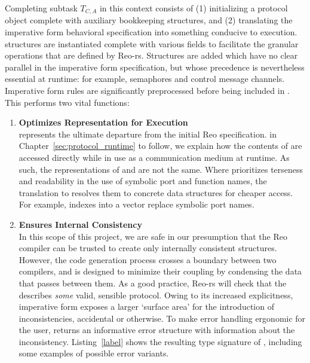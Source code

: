 Completing subtask $T_{C,A}$ in this context consists of (1) initializing a protocol object complete with auxiliary bookkeeping structures, and (2) translating the imperative form behavioral specification into something conducive to execution.  structures are instantiated complete with various fields to facilitate the granular operations that are defined by Reo-rs. Structures are added which have no clear parallel in the imperative form specification, but whose precedence is nevertheless essential at runtime: for example, semaphores and control message channels. Imperative form rules are significantly preprocessed before being included in . This performs two vital functions:

\begin{enumerate}
	\item \textbf{Optimizes Representation for Execution}\\
	 represents the ultimate departure from the initial Reo specification. in Chapter~\ref{sec:protocol_runtime} to follow, we explain how the contents of  are accessed directly while in use as a communication medium at runtime. As such, the representations of  and  are not the same. Where  prioritizes terseness and readability in the use of symbolic port and function names, the translation to  resolves them to concrete data structures for cheaper access. For example, indexes into a vector replace symbolic port names.
	
	\item \textbf{Ensures Internal Consistency}\\
	In this scope of this project, we are safe in our presumption that the Reo compiler can be trusted to create only internally consistent  structures. However, the code generation process crosses a boundary between two compilers, and is designed to minimize their coupling by condensing the data that passes between them. As a good practice, Reo-rs will check that the  describes \textit{some} valid, sensible protocol. Owing to its increased explicitness, imperative form exposes a larger `surface area' for the introduction of inconsistencies, accidental or otherwise. To make error handling ergonomic for the user,  returns an informative error structure with information about the inconsistency. Listing~\ref{label}	shows the resulting type signature of , including some examples of possible error variants.
\end{enumerate}


